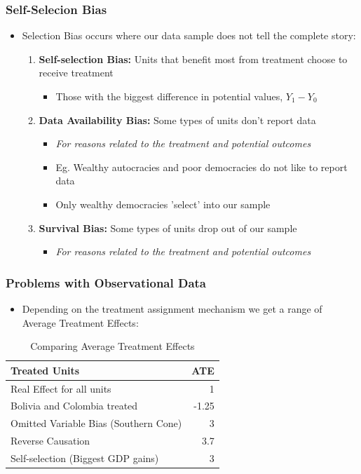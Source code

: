 \documentclass[xcolor=x11names,compress]{beamer}\usepackage[]{graphicx}\usepackage[]{xcolor}
\renewcommand{\(}{\begin{columns}}
\renewcommand{\)}{\end{columns}}
\newcommand{\<}[1]{\begin{column}{#1}}
\renewcommand{\>}{\end{column}}
\begin{document}
\begin{frame}
\frametitle{Self-Selecion Bias}
\begin{itemize}
\item Selection Bias occurs where our data sample does not tell the complete story:
\pause
\begin{enumerate}
\item \textbf{Self-selection Bias:} Units that benefit most from treatment choose to receive treatment
\begin{itemize}
\item Those with the biggest difference  in potential values, $Y_1 - Y_0$
\end{itemize}
\item \textbf{Data Availability Bias:} Some types of units don't report data
\begin{itemize}
\item \textit{For reasons related to the treatment and potential outcomes}
\pause
\item Eg. Wealthy autocracies and poor democracies do not like to report data
\item Only wealthy democracies 'select' into our sample
\pause
\end{itemize}
\item \textbf{Survival Bias:} Some types of units drop out of our sample
\begin{itemize}
\item \textit{For reasons related to the treatment and potential outcomes}
\end{itemize}
\end{enumerate}
\end{itemize}
\end{frame}





\begin{frame}
\frametitle{Problems with Observational Data}
\begin{itemize}
\item Depending on the treatment assignment mechanism we get a range of Average Treatment Effects:
\end{itemize}
\begin{table}[htbp]
  \centering
  \caption{Comparing Average Treatment Effects}
    \begin{tabular}{|l|r|}
    \hline
    \textbf{Treated Units} & \multicolumn{1}{l|}{\textbf{ATE}} \bigstrut\\
    \hline
    Real Effect for all units & 1 \bigstrut\\
    \hline
    Bolivia and Colombia treated & -1.25 \bigstrut\\
    \hline
    Omitted Variable Bias (Southern Cone) & 3 \bigstrut\\
    \hline
    Reverse Causation & 3.7 \bigstrut\\
    \hline
    Self-selection (Biggest GDP gains) & 3 \bigstrut\\
    \hline
    \end{tabular}%
\end{table}%
\end{frame}
\end{document}

